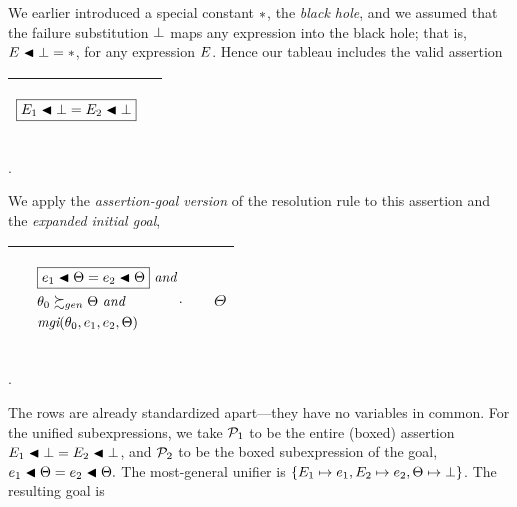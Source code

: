\documentclass[runningheads]{llncs}
\DeclareMathOperator{\uand}{\emph{and}\,}
\DeclareMathOperator{\mgi}{\emph{mgi}}
\begin{document}
We earlier introduced a special constant $\ast$, the \emph{black hole}, and we assumed that the failure substitution $\bot$ maps any expression into the black hole; that is, $E \blacktriangleleft \bot = \ast$, for any expression $E$.  Hence our tableau includes the valid assertion
 \begin{center}
  \begin{tabular}{T}
\hline
 \begin{center} 
${\begin{aligned}
\boxed{{E}_{1} \blacktriangleleft \bot = {E}_{2} \blacktriangleleft \bot}
 \end{aligned}}$\hspace{1cm} 
\end{center}& &  \\  \hline
\end{tabular}.
\end{center}
We apply the \emph{assertion-goal version} of the resolution rule to this assertion and the \emph{expanded initial goal},
\begin{center}
\begin{tabular}{T}
 \hline 
  & 
  \begin{center}
${\begin{aligned} 
&\begin{aligned}
&\boxed{\e{1} \apply \Theta = \e{2} \apply \Theta} \, \uand 
 \\
 \,\, & \thet{0} \moregen \Theta \, \uand
\\
  \,\, & {\mgi}(\thet{0}, \e{1}, \e{2}, \Theta)
\end{aligned}.\end{aligned}}$\hspace{1cm} 
\end{center} & \begin{center}$\Theta$ \end{center} \\
\hline
\end{tabular}.
\end{center}
The rows are already standardized apart---they have no variables in common. For the unified subexpressions, we take  ${\mathcal{P}}_{1}$ to be the entire (boxed) assertion ${E}_{1} \blacktriangleleft \bot = {E}_{2} \blacktriangleleft \bot$, and ${\mathcal{P}}_{2}$ to be the boxed subexpression of the goal, $e_{1} \blacktriangleleft \Theta = e_{2} \blacktriangleleft \Theta.$ The most-general unifier is $\{{E}_{1} \mapsto {e}_{1}, {E}_{2} \mapsto {e}_{2}, \Theta \mapsto \bot\}$.  The resulting goal is
\end{document}
